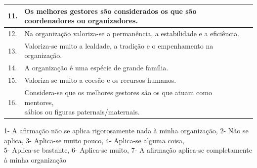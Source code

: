 \begin{table}[h!]
\begin{adjustbox}{max width=\textwidth}
\begin{tabular}{ |c|l|c| }
\hline
11. & Os melhores gestores são considerados os que são coordenadores ou organizadores. & \\
\hline
12. & Na organização valoriza-se a permanência, a estabilidade e a eficiência. & \\
\hline
13. & Valoriza-se muito a lealdade, a tradição e o empenhamento na organização. & \\
\hline
14. & A organização é uma espécie de grande família. & \\
\hline
15. & Valoriza-se muito a coesão e os recursos humanos. & \\
\hline
16. & \makecell[l]{Considera-se que os melhores gestores são os que atuam como mentores, \\ sábios ou figuras paternais/maternais.} & \\
\hline
\end{tabular}
\end{adjustbox}
\end{table}\par
{\tiny 1- A afirmação não se aplica rigorosamente nada à minha organização, 2- Não se aplica, 3- Aplica-se muito pouco, 4- Aplica-se alguma coisa,\\ 5- Aplica-se bastante, 6- Aplica-se muito, 7- A afirmação aplica-se completamente à minha organização
} \\
